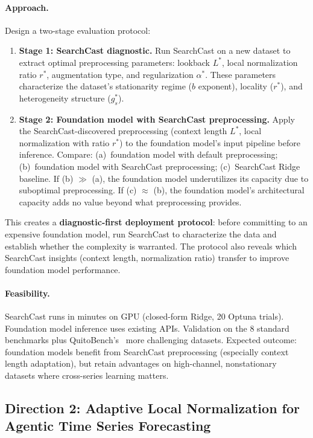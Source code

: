 \documentclass[11pt,a4paper]{article}
\begin{document}
\paragraph{Approach.} Design a two-stage evaluation protocol:
\begin{enumerate}
\item \textbf{Stage 1: SearchCast diagnostic.} Run SearchCast on a new dataset to extract optimal preprocessing parameters: lookback $L^*$, local normalization ratio $r^*$, augmentation type, and regularization $\alpha^*$. These parameters characterize the dataset's stationarity regime ($b$ exponent), locality ($r^*$), and heterogeneity structure ($g_s^*$).
\item \textbf{Stage 2: Foundation model with SearchCast preprocessing.} Apply the SearchCast-discovered preprocessing (context length $L^*$, local normalization with ratio $r^*$) to the foundation model's input pipeline before inference. Compare: (a)~foundation model with default preprocessing; (b)~foundation model with SearchCast preprocessing; (c)~SearchCast Ridge baseline. If (b) $\gg$ (a), the foundation model underutilizes its capacity due to suboptimal preprocessing. If (c) $\approx$ (b), the foundation model's architectural capacity adds no value beyond what preprocessing provides.
\end{enumerate}
This creates a \textbf{diagnostic-first deployment protocol}: before committing to an expensive foundation model, run SearchCast to characterize the data and establish whether the complexity is warranted. The protocol also reveals which SearchCast insights (context length, normalization ratio) transfer to improve foundation model performance.

\paragraph{Feasibility.} SearchCast runs in minutes on GPU (closed-form Ridge, 20 Optuna trials). Foundation model inference uses existing APIs. Validation on the 8 standard benchmarks plus QuitoBench's~\cite{quitobench2026} more challenging datasets. Expected outcome: foundation models benefit from SearchCast preprocessing (especially context length adaptation), but retain advantages on high-channel, nonstationary datasets where cross-series learning matters.

\subsection{Direction 2: Adaptive Local Normalization for Agentic Time Series Forecasting}
\end{document}
